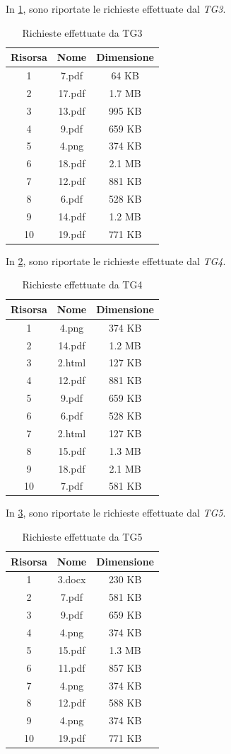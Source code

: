 In \cref{tab:tg3_real}, sono riportate le richieste effettuate dal \textit{TG3}.

\begin{table}[H]
\centering
    \begin{tabular}{|c|c|c|}
    \hline
    \multicolumn{1}{|c|}{\textbf{Risorsa}} &
    \multicolumn{1}{|c|}{\textbf{Nome}} &
    \multicolumn{1}{|c|}{\textbf{Dimensione}}
    \tabularnewline \hline

1 & 7.pdf & 64 KB \tabularnewline \hline
2 & 17.pdf & 1.7 MB \tabularnewline \hline
3 & 13.pdf & 995 KB \tabularnewline \hline
4 & 9.pdf & 659 KB \tabularnewline \hline
5 & 4.png & 374 KB \tabularnewline \hline
6 & 18.pdf & 2.1 MB \tabularnewline \hline
7 & 12.pdf & 881 KB \tabularnewline \hline
8 & 6.pdf & 528 KB \tabularnewline \hline
9 & 14.pdf & 1.2 MB \tabularnewline \hline
10 & 19.pdf & 771 KB \tabularnewline \hline
\end{tabular}
\caption{Richieste effettuate da TG3}
\label{tab:tg3_real}
\end{table}

In \cref{tab:tg4_real}, sono riportate le richieste effettuate dal \textit{TG4}.
\begin{table}[H]
\centering
    \begin{tabular}{|c|c|c|}
    \hline
    \multicolumn{1}{|c|}{\textbf{Risorsa}} &
    \multicolumn{1}{|c|}{\textbf{Nome}} &
    \multicolumn{1}{|c|}{\textbf{Dimensione}}
    \tabularnewline \hline

1 & 4.png & 374 KB  \tabularnewline \hline
2 & 14.pdf & 1.2 MB \tabularnewline \hline
3 & 2.html & 127 KB  \tabularnewline \hline
4 & 12.pdf & 881 KB \tabularnewline \hline
5 & 9.pdf & 659 KB  \tabularnewline \hline
6 & 6.pdf & 528 KB  \tabularnewline \hline
7 & 2.html & 127 KB  \tabularnewline \hline
8 & 15.pdf & 1.3 MB \tabularnewline \hline
9 & 18.pdf & 2.1 MB \tabularnewline \hline
10 & 7.pdf & 581 KB \tabularnewline \hline
\end{tabular}
\caption{Richieste effettuate da TG4}
\label{tab:tg4_real}
\end{table}

In \cref{tab:tg5_real}, sono riportate le richieste effettuate dal \textit{TG5}.
\begin{table}[H]
\centering
    \begin{tabular}{|c|c|c|}
    \hline
    \multicolumn{1}{|c|}{\textbf{Risorsa}} &
    \multicolumn{1}{|c|}{\textbf{Nome}} &
    \multicolumn{1}{|c|}{\textbf{Dimensione}}
    \tabularnewline \hline

1 & 3.docx & 230 KB \tabularnewline \hline
2 & 7.pdf & 581 KB \tabularnewline \hline
3 & 9.pdf & 659 KB \tabularnewline \hline
4 & 4.png & 374 KB \tabularnewline \hline
5 & 15.pdf & 1.3 MB \tabularnewline \hline
6 & 11.pdf & 857 KB \tabularnewline \hline
7 & 4.png & 374 KB \tabularnewline \hline
8 & 12.pdf & 588 KB \tabularnewline \hline
9 & 4.png & 374 KB \tabularnewline \hline
10 & 19.pdf & 771 KB \tabularnewline \hline

\end{tabular}
\caption{Richieste effettuate da TG5}
\label{tab:tg5_real}
\end{table}

